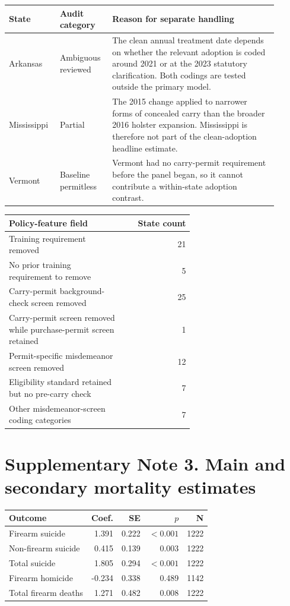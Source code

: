 \documentclass[10pt]{article}
\begin{document}
\begin{center}
\begin{tabular}{L{0.16\linewidth}L{0.16\linewidth}L{0.58\linewidth}}
\toprule
State & Audit category & Reason for separate handling \\
\midrule
Arkansas & Ambiguous reviewed & The clean annual treatment date depends on whether the relevant adoption is coded around 2021 or at the 2023 statutory clarification. Both codings are tested outside the primary model. \\
Mississippi & Partial & The 2015 change applied to narrower forms of concealed carry than the broader 2016 holster expansion. Mississippi is therefore not part of the clean-adoption headline estimate. \\
Vermont & Baseline permitless & Vermont had no carry-permit requirement before the panel began, so it cannot contribute a within-state adoption contrast. \\
\bottomrule
\end{tabular}
\end{center}


\begin{center}
\begin{tabular}{L{0.62\linewidth}r}
\toprule
Policy-feature field & State count \\
\midrule
Training requirement removed & 21 \\
No prior training requirement to remove & 5 \\
Carry-permit background-check screen removed & 25 \\
Carry-permit screen removed while purchase-permit screen retained & 1 \\
Permit-specific misdemeanor screen removed & 12 \\
Eligibility standard retained but no pre-carry check & 7 \\
Other misdemeanor-screen coding categories & 7 \\
\bottomrule
\end{tabular}
\end{center}


\section*{Supplementary Note 3. Main and secondary mortality estimates}


\begin{center}
\begin{tabular}{lrrrr}
\toprule
Outcome & Coef. & SE & $p$ & N \\
\midrule
Firearm suicide & 1.391 & 0.222 & $<0.001$ & 1222 \\
Non-firearm suicide & 0.415 & 0.139 & 0.003 & 1222 \\
Total suicide & 1.805 & 0.294 & $<0.001$ & 1222 \\
Firearm homicide & -0.234 & 0.338 & 0.489 & 1142 \\
Total firearm deaths & 1.271 & 0.482 & 0.008 & 1222 \\
\bottomrule
\end{tabular}
\end{center}
\end{document}
